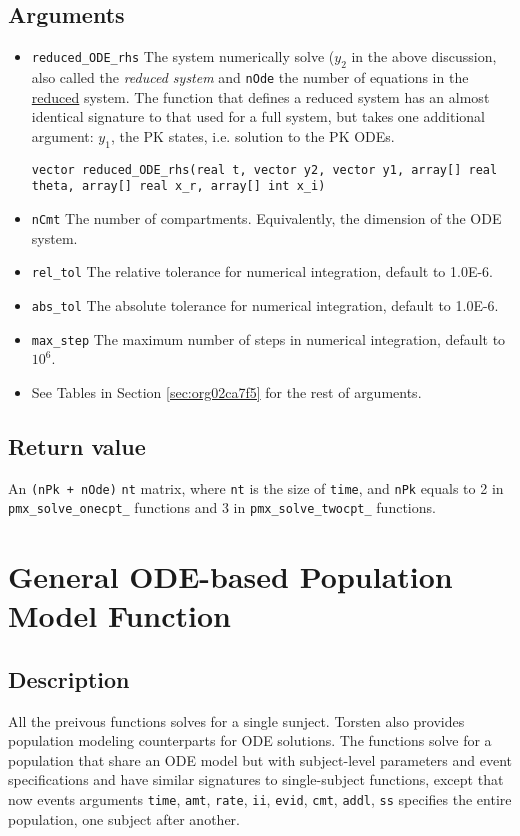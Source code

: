 \documentclass[12pt, reqno, oneside]{amsbook}
\numberwithin{equation}{chapter}
\numberwithin{figure}{chapter}
\numberwithin{table}{chapter}
\theoremstyle{remark}
\begin{document}
\subsection{Arguments}
\label{sec:org1b037b1}
\begin{itemize}
\item \texttt{reduced\_ODE\_rhs}
The system  numerically solve (\(y_2\) in the above discussion, also called the
\emph{reduced system} and \texttt{nOde} the number of equations in
the \uline{reduced} system. The function that defines a reduced
system has an almost identical signature to that used for a full
system, but takes one additional argument: \(y_1\), the PK states,
i.e. solution to the PK ODEs.
\begin{verbatim}
vector reduced_ODE_rhs(real t, vector y2, vector y1, array[] real theta, array[] real x_r, array[] int x_i)
\end{verbatim}
\item \texttt{nCmt}
The number of compartments. Equivalently, the dimension of the ODE system.
\item \texttt{rel\_tol}
The relative tolerance for numerical integration, default to 1.0E-6.
\item \texttt{abs\_tol}
The absolute tolerance for numerical integration, default to 1.0E-6.
\item \texttt{max\_step}
The maximum number of steps in numerical integration, default to \(10^6\).
\item See Tables in Section \ref{sec:org02ca7f5} for the rest of arguments.
\end{itemize}
\subsection{Return value}
\label{sec:org84c1333}
An \texttt{(nPk + nOde)} \texttimes{} \texttt{nt} matrix, where \texttt{nt} is the size of
\texttt{time}, and \texttt{nPk} equals to 2 in
\texttt{pmx\_solve\_onecpt\_} functions
and 3 in \texttt{pmx\_solve\_twocpt\_} functions.

\section{General ODE-based Population Model Function}
\label{sec:org6157bc2}
\subsection{Description}
\label{sec:org208bcf5}
All the preivous functions solves for a single sunject. Torsten also
provides population modeling counterparts for ODE solutions. The
functions solve for a population that share an ODE model but with
subject-level parameters and event specifications and have similar
signatures to single-subject functions, except that now events
arguments \texttt{time}, \texttt{amt}, \texttt{rate}, \texttt{ii},
\texttt{evid}, \texttt{cmt},
\texttt{addl}, \texttt{ss} specifies the entire
population, one subject after another.
\end{document}
